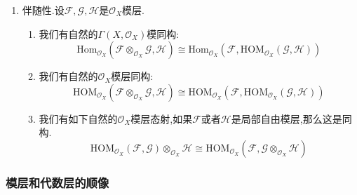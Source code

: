 \begin{enumerate}
\begin{proof}
		按照$\mathrm{HOM}_{\mathscr{O}_X}(-,\mathscr{G})$是左正合函子,得到正合列:
		$$\xymatrix{0\ar[r]&\mathrm{HOM}_{\mathscr{O}_X}(\mathscr{F},\mathscr{G})\ar[r]&\mathrm{HOM}_{\mathscr{O}_X}(\mathscr{O}_X^n,\mathscr{G})\ar[r]&\mathrm{HOM}_{\mathscr{O}_X}(\mathscr{O}_X^n,\mathscr{G})}$$
		
		取stalk是一个正合函子,于是有正合列:
		$$\xymatrix{0\ar[r]&\mathrm{HOM}_{\mathscr{O}_X}(\mathscr{F},\mathscr{G})_x\ar[r]&\mathscr{G}_x^n\ar[r]&\mathscr{G}_x^m}$$
		
		另一方面,对\ref{f.r}取stalk,得到正合列:
		$$\xymatrix{\mathscr{O}_{X,x}^m\ar[r]&\mathscr{O}_{X,x}^n\ar[r]&\mathscr{F}_x\ar[r]&0}$$
		
		再作用左正合函子$\mathrm{Hom}_{\mathscr{O}_{X,x}}(-,\mathscr{G}_x)$得到:
		$$\xymatrix{0\ar[r]&\mathrm{Hom}_{\mathscr{O}_{X,x}}\ar[r]&\mathscr{G}_x^n\ar[r]&\mathscr{G}_x^m}$$
		
		于是$\mathrm{Hom}_{\mathscr{O}_{X,x}}$和$\mathrm{HOM}_{\mathscr{O}_X}(\mathscr{F},\mathscr{G})_x$都是$\mathscr{G}_x^n\to\mathscr{G}_x^m$的核,所以它们典范同构.
	\end{proof}
	\item 伴随性.设$\mathscr{F},\mathscr{G},\mathscr{H}$是$\mathscr{O}_X$模层.
	\begin{enumerate}
		\item 我们有自然的$\Gamma(X,\mathscr{O}_X)$模同构:
		$$\mathrm{Hom}_{\mathscr{O}_X}(\mathscr{F}\otimes_{\mathscr{O}_X}\mathscr{G},\mathscr{H})\cong\mathrm{Hom}_{\mathscr{O}_X}(\mathscr{F},\mathrm{HOM}_{\mathscr{O}_X}(\mathscr{G},\mathscr{H}))$$
		\item 我们有自然的$\mathscr{O}_X$模层同构:
		$$\mathrm{HOM}_{\mathscr{O}_X}(\mathscr{F}\otimes_{\mathscr{O}_X}\mathscr{G},\mathscr{H})\cong\mathrm{HOM}_{\mathscr{O}_X}(\mathscr{F},\mathrm{HOM}_{\mathscr{O}_X}(\mathscr{G},\mathscr{H}))$$
		\item 我们有如下自然的$\mathscr{O}_X$模层态射,如果$\mathscr{F}$或者$\mathscr{H}$是局部自由模层,那么这是同构.
		$$\mathrm{HOM}_{\mathscr{O}_X}(\mathscr{F},\mathscr{G})\otimes_{\mathscr{O}_X}\mathscr{H}\cong\mathrm{HOM}_{\mathscr{O}_X}(\mathscr{F},\mathscr{G}\otimes_{\mathscr{O}_X}\mathscr{H})$$
	\end{enumerate}
\end{enumerate}
\subsubsection{模层和代数层的顺像}

